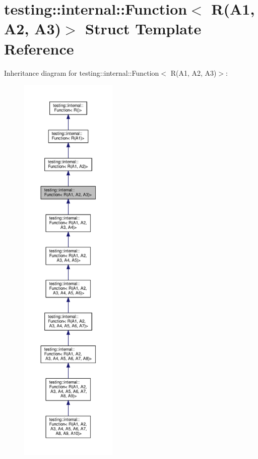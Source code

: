 \hypertarget{structtesting_1_1internal_1_1_function_3_01_r_07_a1_00_01_a2_00_01_a3_08_4}{}\section{testing\+:\+:internal\+:\+:Function$<$ R(A1, A2, A3)$>$ Struct Template Reference}
\label{structtesting_1_1internal_1_1_function_3_01_r_07_a1_00_01_a2_00_01_a3_08_4}


Inheritance diagram for testing\+:\+:internal\+:\+:Function$<$ R(A1, A2, A3)$>$\+:
\nopagebreak
\begin{figure}[H]
\begin{center}
\leavevmode
\includegraphics[height=550pt]{structtesting_1_1internal_1_1_function_3_01_r_07_a1_00_01_a2_00_01_a3_08_4__inherit__graph}
\end{center}
\end{figure}



